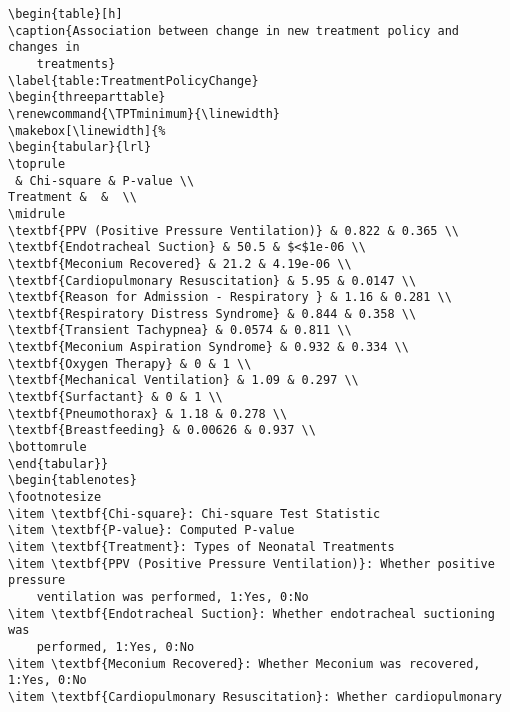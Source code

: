 \documentclass[11pt]{article}
\begin{document}
\begin{Verbatim}[tabsize=4]
\begin{table}[h]
\caption{Association between change in new treatment policy and changes in
	treatments}
\label{table:TreatmentPolicyChange}
\begin{threeparttable}
\renewcommand{\TPTminimum}{\linewidth}
\makebox[\linewidth]{%
\begin{tabular}{lrl}
\toprule
 & Chi-square & P-value \\
Treatment &  &  \\
\midrule
\textbf{PPV (Positive Pressure Ventilation)} & 0.822 & 0.365 \\
\textbf{Endotracheal Suction} & 50.5 & $<$1e-06 \\
\textbf{Meconium Recovered} & 21.2 & 4.19e-06 \\
\textbf{Cardiopulmonary Resuscitation} & 5.95 & 0.0147 \\
\textbf{Reason for Admission - Respiratory } & 1.16 & 0.281 \\
\textbf{Respiratory Distress Syndrome} & 0.844 & 0.358 \\
\textbf{Transient Tachypnea} & 0.0574 & 0.811 \\
\textbf{Meconium Aspiration Syndrome} & 0.932 & 0.334 \\
\textbf{Oxygen Therapy} & 0 & 1 \\
\textbf{Mechanical Ventilation} & 1.09 & 0.297 \\
\textbf{Surfactant} & 0 & 1 \\
\textbf{Pneumothorax} & 1.18 & 0.278 \\
\textbf{Breastfeeding} & 0.00626 & 0.937 \\
\bottomrule
\end{tabular}}
\begin{tablenotes}
\footnotesize
\item \textbf{Chi-square}: Chi-square Test Statistic
\item \textbf{P-value}: Computed P-value
\item \textbf{Treatment}: Types of Neonatal Treatments
\item \textbf{PPV (Positive Pressure Ventilation)}: Whether positive pressure
	ventilation was performed, 1:Yes, 0:No
\item \textbf{Endotracheal Suction}: Whether endotracheal suctioning was
	performed, 1:Yes, 0:No
\item \textbf{Meconium Recovered}: Whether Meconium was recovered, 1:Yes, 0:No
\item \textbf{Cardiopulmonary Resuscitation}: Whether cardiopulmonary

\end{Verbatim}
\end{document}
